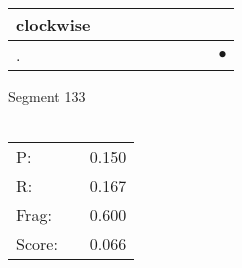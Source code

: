 \documentclass[landscape]{article}
\newcommand{\ssp}{\hspace{2pt}}
\newcommand{\mex}{\cellcolor{g}$\bullet$}
\begin{document}
\begin{tabular}{|l|p{10pt}|p{10pt}|p{10pt}|p{10pt}|p{10pt}|p{10pt}|p{10pt}|p{10pt}|}
\hline
\ssp clockwise \ssp&\hspace{2pt}&\hspace{2pt}&\hspace{2pt}&\hspace{2pt}&\hspace{2pt}&\hspace{2pt}&\hspace{2pt}&\hspace{2pt}\\
\hline
\ssp \cellcolor{ref7}. \ssp&\hspace{2pt}&\hspace{2pt}&\hspace{2pt}&\hspace{2pt}&\hspace{2pt}&\hspace{2pt}&\hspace{2pt}&\hspace{2pt}\mex\\
\hline
\end{tabular}

\vspace{6pt}
\noindent Segment 133\\\\
\noindent\begin{tabular}{lm{12pt}r}
\hline
P:&&0.150\\
R:&&0.167\\
Frag:&&0.600\\
Score:&&0.066\\
\end{tabular}

\newpage
\end{document}
